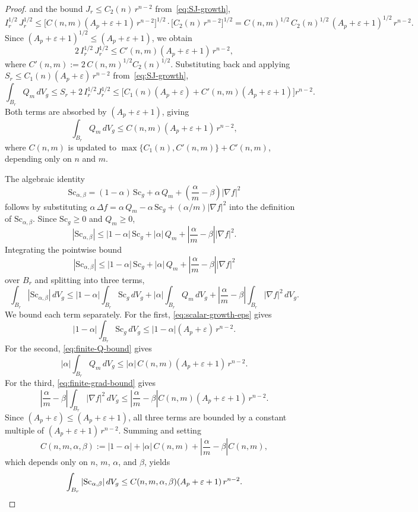 \documentclass[12pt,oneside,a4paper]{article}
\theoremstyle{mytheorem}
\theoremstyle{remark}
\begin{document}
\begin{proof}
and the bound $J_r \le C_2(n)\,r^{n-2}$ from~\eqref{eq:SJ-growth},
\[
  I_r^{1/2}\,J_r^{1/2}
  \le \bigl[C(n,m)(A_p+\varepsilon+1)\,r^{n-2}\bigr]^{1/2}
     \cdot \bigl[C_2(n)\,r^{n-2}\bigr]^{1/2}
  = C(n,m)^{1/2}\,C_2(n)^{1/2}\,(A_p+\varepsilon+1)^{1/2}\,r^{n-2}.
\]
Since $(A_p+\varepsilon+1)^{1/2} \le (A_p+\varepsilon+1)$, we obtain
\[
  2\,I_r^{1/2}\,J_r^{1/2}
  \le C'(n,m)(A_p+\varepsilon+1)\,r^{n-2},
\]
where $C'(n,m) := 2\,C(n,m)^{1/2}C_2(n)^{1/2}$.
Substituting back and applying $S_r \le C_1(n)(A_p+\varepsilon)\,r^{n-2}$
from~\eqref{eq:SJ-growth},
\[
  \int_{B_r}Q_m\,dV_g
  \le S_r + 2\,I_r^{1/2}J_r^{1/2}
  \le \bigl[C_1(n)(A_p+\varepsilon) + C'(n,m)(A_p+\varepsilon+1)\bigr]r^{n-2}.
\]
Both terms are absorbed by $(A_p+\varepsilon+1)$, giving
\begin{equation}\label{eq:finite-Q-bound}
  \int_{B_r}Q_m\,dV_g
  \le C(n,m)(A_p+\varepsilon+1)\,r^{n-2},
\end{equation}
where $C(n,m)$ is updated to $\max\{C_1(n), C'(n,m)\} + C'(n,m)$,
depending only on $n$ and $m$.

The algebraic identity
\begin{equation}\label{eq:finite-algebraic-identity}
  \mathrm{Sc}_{\alpha,\beta}
  =(1-\alpha)\,\mathrm{Sc}_g
   +\alpha\,Q_m
   +\!\left(\frac{\alpha}{m}-\beta\right)|\nabla f|^2
\end{equation}
follows by substituting $\alpha\,\Delta f=\alpha\,Q_m-\alpha\,\mathrm{Sc}_g
+(\alpha/m)|\nabla f|^2$ into the definition of $\mathrm{Sc}_{\alpha,\beta}$.
Since $\mathrm{Sc}_g\ge 0$ and $Q_m\ge 0$,
\[
  |\mathrm{Sc}_{\alpha,\beta}|
  \le|1-\alpha|\,\mathrm{Sc}_g
    +|\alpha|\,Q_m
    +\left|\frac{\alpha}{m}-\beta\right||\nabla f|^2.
\]
Integrating the pointwise bound
\[
  |\mathrm{Sc}_{\alpha,\beta}|
  \le |1-\alpha|\,\mathrm{Sc}_g
    + |\alpha|\,Q_m
    + \left|\frac{\alpha}{m}-\beta\right||\nabla f|^2
\]
over $B_r$ and splitting into three terms,
\[
  \int_{B_r}|\mathrm{Sc}_{\alpha,\beta}|\,dV_g
  \le |1-\alpha|\int_{B_r}\mathrm{Sc}_g\,dV_g
    + |\alpha|\int_{B_r}Q_m\,dV_g
    + \left|\frac{\alpha}{m}-\beta\right|\int_{B_r}|\nabla f|^2\,dV_g.
\]
We bound each term separately. For the first, \eqref{eq:scalar-growth-eps} gives
\[
  |1-\alpha|\int_{B_r}\mathrm{Sc}_g\,dV_g
  \le |1-\alpha|(A_p+\varepsilon)\,r^{n-2}.
\]
For the second, \eqref{eq:finite-Q-bound} gives
\[
  |\alpha|\int_{B_r}Q_m\,dV_g
  \le |\alpha|\,C(n,m)(A_p+\varepsilon+1)\,r^{n-2}.
\]
For the third, \eqref{eq:finite-grad-bound} gives
\[
  \left|\frac{\alpha}{m}-\beta\right|\int_{B_r}|\nabla f|^2\,dV_g
  \le \left|\frac{\alpha}{m}-\beta\right|C(n,m)(A_p+\varepsilon+1)\,r^{n-2}.
\]
Since $(A_p+\varepsilon) \le (A_p+\varepsilon+1)$, all three terms are
bounded by a constant multiple of $(A_p+\varepsilon+1)\,r^{n-2}$.
Summing and setting
\[
  C(n,m,\alpha,\beta)
  := |1-\alpha| + |\alpha|\,C(n,m)
     + \left|\frac{\alpha}{m}-\beta\right|C(n,m),
\]
which depends only on $n$, $m$, $\alpha$, and $\beta$, yields
\begin{equation*}
  \int_{B_r}|\mathrm{Sc}_{\alpha,\beta}|\,dV_g
  \le C(n,m,\alpha,\beta)(A_p+\varepsilon+1)\,r^{n-2}.\qedhere
\end{equation*}
\end{proof}
\end{document}
